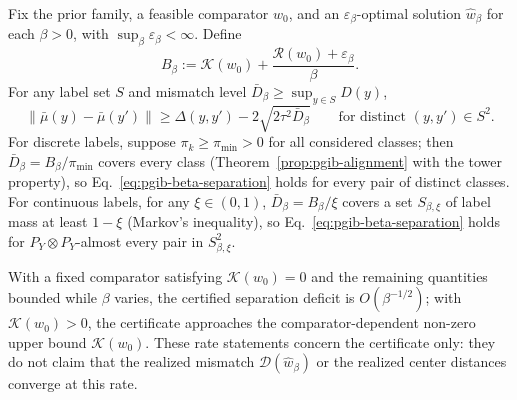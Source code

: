 \begin{corollary}
\label{cor:pgib-beta-transfer}
Fix the prior family, a feasible comparator $w_0$, and an
$\varepsilon_\beta$-optimal solution $\widehat w_\beta$ for each $\beta>0$, with
$\sup_\beta\varepsilon_\beta<\infty$. Define
\begin{equation}
B_\beta:=\mathcal K(w_0)+\frac{\mathcal R(w_0)+\varepsilon_\beta}{\beta}.
\label{eq:pgib-beta-budget}
\end{equation}
For any label set $S$ and mismatch level $\bar D_\beta\ge\sup_{y\in S}D(y)$,
\begin{equation}
\|\bar\mu(y)-\bar\mu(y')\|
\ge \Delta(y,y')-2\sqrt{2\tau^2\bar D_\beta}
\qquad\text{for distinct } (y,y')\in S^2.
\label{eq:pgib-beta-separation}
\end{equation}
For discrete labels, suppose $\pi_k\ge\pi_{\min}>0$ for all considered classes;
then $\bar D_\beta=B_\beta/\pi_{\min}$ covers every class
(Theorem~\ref{prop:pgib-alignment} with the tower property), so
Eq.~\eqref{eq:pgib-beta-separation} holds for every pair of distinct classes. For
continuous labels, for any $\xi\in(0,1)$, $\bar D_\beta=B_\beta/\xi$ covers a set
$S_{\beta,\xi}$ of label mass at least $1-\xi$ (Markov's inequality), so
Eq.~\eqref{eq:pgib-beta-separation} holds for $P_Y\otimes P_Y$-almost every pair
in $S_{\beta,\xi}^2$.


With a fixed comparator satisfying $\mathcal K(w_0)=0$ and the remaining quantities
bounded while $\beta$ varies, the certified separation deficit is
$O(\beta^{-1/2})$; with $\mathcal K(w_0)>0$, the certificate approaches the
comparator-dependent non-zero upper bound $\mathcal K(w_0)$. These rate statements
concern the certificate only: they do not claim that the realized mismatch
$\mathcal D(\widehat w_\beta)$ or the realized center distances converge at this
rate.
\end{corollary}
